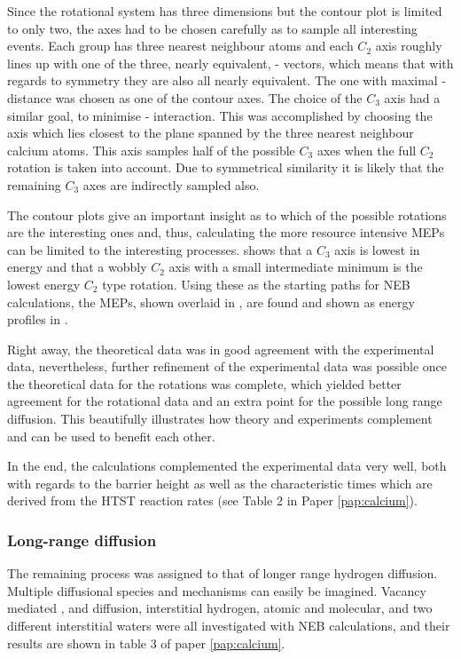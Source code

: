 Since the rotational system has three dimensions but the contour plot is limited to only two, the axes had to be chosen carefully as to sample all interesting events.
Each  group has three nearest neighbour  atoms and each $C_2$ axis roughly lines up with one of the three, nearly equivalent, - vectors, which means that with regards to symmetry they are also all nearly equivalent.
The one with maximal - distance was chosen as one of the contour axes.
The choice of the $C_3$ axis had a similar goal, to minimise - interaction.
This was accomplished by choosing the axis which lies closest to the plane spanned by the three nearest neighbour calcium atoms.
This axis samples half of the possible $C_3$ axes when the full $C_2$ rotation is taken into account.
Due to symmetrical similarity it is likely that the remaining $C_3$ axes are indirectly sampled also.

The contour plots give an important insight as to which of the possible rotations are the interesting ones and, thus, calculating the more resource intensive MEPs can be limited to the interesting processes.
 shows that a $C_3$ axis is lowest in energy and that a wobbly $C_2$ axis with a small intermediate minimum is the lowest energy $C_2$ type rotation.
Using these as the starting paths for NEB calculations, the MEPs, shown overlaid in , are found and shown as energy profiles in .

Right away, the theoretical data was in good agreement with the experimental data, nevertheless, further refinement of the experimental data was possible once the theoretical data for the rotations was complete, which yielded better agreement for the rotational data and an extra point for the possible long range diffusion.
This beautifully illustrates how theory and experiments complement and can be used to benefit each other.

In the end, the calculations complemented the experimental data very well, both with regards to the barrier height as well as the characteristic times which are derived from the HTST reaction rates (see Table 2 in Paper \ref{pap:calcium}).

\subsubsection{Long-range diffusion}
The remaining process was assigned to that of longer range hydrogen diffusion.
Multiple diffusional species and mechanisms can easily be imagined.
Vacancy mediated ,   and  diffusion, interstitial hydrogen, atomic and molecular, and two different interstitial waters were all investigated with NEB calculations, and their results are shown in table 3 of paper \ref{pap:calcium}.

